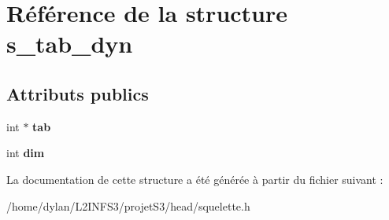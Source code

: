 \hypertarget{structs__tab__dyn}{}\section{Référence de la structure s\+\_\+tab\+\_\+dyn}
\label{structs__tab__dyn}
\subsection*{Attributs publics}
\begin{DoxyCompactItemize}
\item 
\mbox{\label{structs__tab__dyn_a2063f1b11458b095684438e790ad6127}} 
int $\ast$ {\bfseries tab}
\item 
\mbox{\label{structs__tab__dyn_aec37643e88098f3c1466cc3e64ef303b}} 
int {\bfseries dim}
\end{DoxyCompactItemize}


La documentation de cette structure a été générée à partir du fichier suivant \+:\begin{DoxyCompactItemize}
\item 
/home/dylan/\+L2\+I\+N\+F\+S3/projet\+S3/head/squelette.\+h\end{DoxyCompactItemize}
